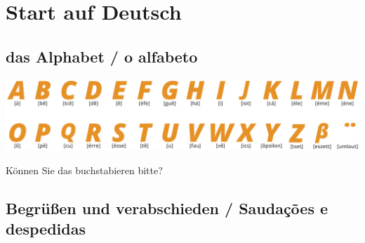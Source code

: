 \chapter{Start auf Deutsch}\label{chapter:start_auf_deutsch}

    \section{das Alphabet / o alfabeto}\label{section:deutsch:alphabet}    

        \includegraphics[width=.9\linewidth]{figures/dasAlphabet.eps}

        Können Sie das buchstabieren bitte? 

    \section{Begrüßen und verabschieden / Saudações e despedidas}\label{section:begrussenverabschieden}

